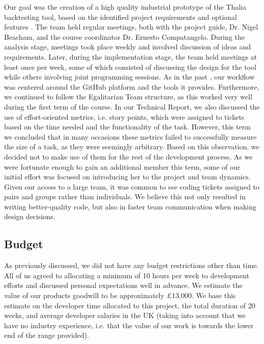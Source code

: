 \documentclass[main.tex]{subfiles}
\begin{document}
Our goal was the creation of a high quality industrial prototype of the Thalia backtesting tool, based on the identified project requirements and optional features \cite{TR}. The team held regular meetings, both with the project guide, Dr. Nigel Beacham, and the course coordinator Dr. Ernesto Compatangelo. During the analysis stage, meetings took place weekly and involved discussion of ideas and requirements. Later, during the implementation stage, the team held meetings at least once per week, some of which consisted of discussing the design for the tool while others involving joint programming sessions. \newline \newline
As in the past \cite{TR}, our workflow was centered around the GitHub platform and the tools it provides.
Furthermore, we continued to follow the Egalitarian Team structure, as this worked very well during the first term of the course.
In our Technical Report, we also discussed the use of effort-oriented metrics, i.e. story points, which were assigned to tickets based on the time needed and the functionality of the task.
However, this term we concluded that in many occasions these metrics failed to successfully measure the size of a task, as they were seemingly arbitrary. Based on this observation, we decided not to make use of them for the rest of the development process. \newline \newline
As we were fortunate enough to gain an additional member this term, some of our initial effort was focused on introducing her to the project and team dynamics. Given our access to a large team, it was common to see coding tickets assigned to pairs and groups rather than individuals. We believe this not only resulted in writing better-quality code, but also in faster team communication when making design decisions.

\subsection{Budget}
As previously discussed, we did not have any budget restrictions other than time. All of us agreed to allocating a minimum of 10 hours per week to development efforts and discussed personal expectations well in advance.  We estimate the value of our products goodwill to be approximately £13,000. We base this estimate on the developer time allocated to this project, the total duration of 20 weeks, and average developer salaries in the UK \cite{DeveloperSalary} (taking into account that we have no industry experience, i.e. that the value of our work is towards the lower end of the range provided).
\end{document}
